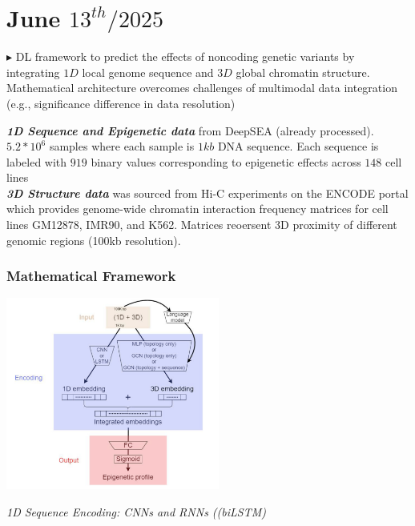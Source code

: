 \documentclass[../main.tex]{subfiles}
\begin{document}
\chapter{June $13^{th} / 2025$}
\label{ch:tufte-design}

 \cite{10.1093/bioinformatics/btad541}

\hrulefill

$\blacktriangleright$ DL framework to predict the effects of noncoding genetic variants by integrating $1D$ local genome sequence and $3D$ global chromatin structure.
Mathematical architecture overcomes challenges of multimodal data integration (e.g., significance difference in data resolution)

\textbf{\textit{1D Sequence and Epigenetic data}} from DeepSEA (already processed). $5.2 *10^6$ samples where each sample is $1kb$ DNA sequence. Each sequence is labeled with $919$ binary values corresponding to epigenetic effects across $148$ cell lines\\

\textbf{\textit{3D Structure data}} was sourced from Hi-C experiments on the ENCODE portal which provides genome-wide chromatin interaction frequency matrices for cell lines GM12878, IMR90, and K562. Matrices reoersent 3D proximity of different genomic regions (100kb resolution).

\subsection{Mathematical Framework}

\begin{center}
    \includegraphics[width=7cm]{files/images/multimodal_nn.png}
\end{center}

\textit{1D Sequence Encoding: CNNs and RNNs ((biLSTM)}
\end{document}
